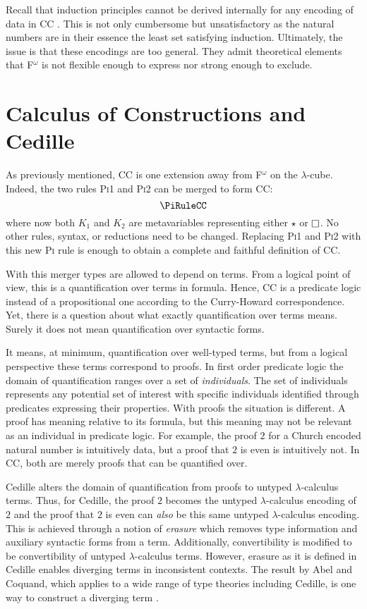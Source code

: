 Recall that induction principles cannot be derived internally for any encoding of data in CC \cite{geuvers2001_noind}.
This is not only cumbersome but unsatisfactory as the natural numbers are in their essence the least set satisfying induction.
Ultimately, the issue is that these encodings are too general.
They admit theoretical elements that F$^\omega$ is not flexible enough to express nor strong enough to exclude.

\section{Calculus of Constructions and Cedille}

As previously mentioned, CC is one extension away from F$^\omega$ on the $\lambda$-cube.
Indeed, the two rules \textsc{Pi1} and \textsc{Pi2} can be merged to form CC:
$$\PiRuleCC$$
where now both $K_1$ and $K_2$ are metavariables representing either $\star$ or $\kind$.
No other rules, syntax, or reductions need to be changed.
Replacing \textsc{Pi1} and \textsc{Pi2} with this new \textsc{Pi} rule is enough to obtain a complete and faithful definition of CC.

With this merger types are allowed to depend on terms.
From a logical point of view, this is a quantification over terms in formula.
Hence, CC is a predicate logic instead of a propositional one according to the Curry-Howard correspondence.
Yet, there is a question about what exactly quantification over terms means.
Surely it does not mean quantification over syntactic forms.

It means, at minimum, quantification over well-typed terms, but from a logical perspective these terms correspond to proofs.
In first order predicate logic the domain of quantification ranges over a set of \textit{individuals}.
The set of individuals represents any potential set of interest with specific individuals identified through predicates expressing their properties.
With proofs the situation is different.
A proof has meaning relative to its formula, but this meaning may not be relevant as an individual in predicate logic.
For example, the proof $2$ for a Church encoded natural number is intuitively data, but a proof that $2$ is even is intuitively not.
In CC, both are merely proofs that can be quantified over.

Cedille alters the domain of quantification from proofs to untyped $\lambda$-calculus terms.
Thus, for Cedille, the proof $2$ becomes the untyped $\lambda$-calculus encoding of $2$ and the proof that $2$ is even can \textit{also} be this same untyped $\lambda$-calculus encoding.
This is achieved through a notion of \textit{erasure} which removes type information and auxiliary syntactic forms from a term.
Additionally, convertibility is modified to be convertibility of untyped $\lambda$-calculus terms.
However, erasure as it is defined in Cedille enables diverging terms in inconsistent contexts.
The result by Abel and Coquand, which applies to a wide range of type theories including Cedille, is one way to construct a diverging term \cite{abel2020_normalization}.

